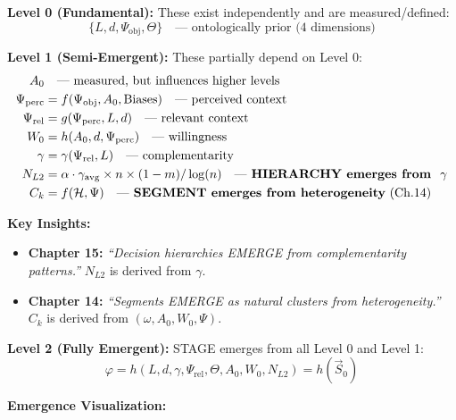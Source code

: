 \begin{tcolorbox}[colback=blue!5!white, colframe=blue!75!black,
    title=\textbf{The Emergence Chain (Refined)}]

\textbf{Level 0 (Fundamental):} These exist independently and are measured/defined:
\begin{equation}
\{L, d, \Psi_{\text{obj}}, \Theta\} \quad \text{--- ontologically prior (4 dimensions)}
\end{equation}

\textbf{Level 1 (Semi-Emergent):} These partially depend on Level 0:
\begin{align}
A_0 &\quad \text{--- measured, but influences higher levels} \\
\Psi_{\text{perc}} &= f(\Psi_{\text{obj}}, A_0, \text{Biases}) \quad \text{--- perceived context} \\
\Psi_{\text{rel}} &= g(\Psi_{\text{perc}}, L, d) \quad \text{--- relevant context} \\
W_0 &= h(A_0, d, \Psi_{\text{perc}}) \quad \text{--- willingness} \\
\gamma &= \gamma(\Psi_{\text{rel}}, L) \quad \text{--- complementarity} \\
N_{L2} &= \alpha \cdot \gamma_{\text{avg}} \times n \times (1-m) / \log(n) \quad \text{--- \textbf{HIERARCHY emerges from } $\gamma$} \\
C_k &= f(\mathcal{H}, \Psi) \quad \text{--- \textbf{SEGMENT emerges from heterogeneity} (Ch.14)}
\end{align}

\textbf{Key Insights:}
\begin{itemize}[nosep]
    \item \textbf{Chapter 15:} \textit{``Decision hierarchies EMERGE from complementarity patterns.''} $N_{L2}$ is derived from $\gamma$.
    \item \textbf{Chapter 14:} \textit{``Segments EMERGE as natural clusters from heterogeneity.''} $C_k$ is derived from $(\omega, A_0, W_0, \Psi)$.
\end{itemize}

\textbf{Level 2 (Fully Emergent):} STAGE emerges from all Level 0 and Level 1:
\begin{equation}
\boxed{\varphi = h(L, d, \gamma, \Psi_{\text{rel}}, \Theta, A_0, W_0, N_{L2}) = h(\vec{S}_0)}
\end{equation}

\textbf{Emergence Visualization:}
\begin{center}
\end{center}
\end{tcolorbox}
